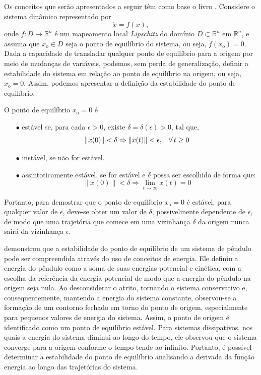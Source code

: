 Os conceitos que serão apresentados a seguir têm como base o livro \cite{khalil2002}. Considere o sistema dinâmico representado por \begin{equation}\dot{x} = f(x), \end{equation} onde $f: D \rightarrow \mathbb{R}^n$ é um mapeamento local \textit{Lipschitz} do domínio $D \subset \mathbb{R}^n$ em $\mathbb{R}^n$, e assuma que $x_{\mathrm{o}} \in D$ seja o ponto de equilíbrio do sistema, ou seja, $f(x_{\mathrm{o}}) = 0$. Dada a capacidade de transladar qualquer ponto de equilíbrio para a origem por meio de mudanças de variáveis, podemos, sem perda de generalização, definir a estabilidade do sistema em relação ao ponto de equilíbrio na origem, ou seja, $x_{\mathrm{o}} = 0$. Assim, podemos apresentar a definição da estabilidade do ponto de equilíbrio.

\begin{definition}
  O ponto de equilíbrio $x_{\mathrm{o}} = 0$ é

  \begin{enumerate}
    \item[$\bullet$] estável se, para cada $\epsilon > 0$, existe $\delta = \delta(\epsilon) > 0$, tal que,
          $$ \lVert x(0)\rVert < \delta \Rightarrow \lVert x(t)\rVert < \epsilon, \hspace{0.3cm} \forall \, t \geq 0$$
    \item[$\bullet$] instável, se não for estável.
    \item[$\bullet$] assintoticamente estável, se for estável e $\delta$ possa   ser escolhido de forma que:
          $$ \lVert x(0)\rVert < \delta \Rightarrow \lim_{t \rightarrow \infty}x(t) = 0$$
  \end{enumerate}
\end{definition}

Portanto, para demostrar que o ponto de equilíbrio $x_{\mathrm{o}} = 0$ é estável, para qualquer valor de $\epsilon$, deve-se obter um valor de $\delta$, possivelmente dependente de $\epsilon$, de modo que uma trajetória que comece em uma vizinhança $\delta$ da origem nunca sairá da vizinhança $\epsilon$.

\cite{khalil2002} demonstrou que a estabilidade do ponto de equilíbrio de um sistema de pêndulo pode ser compreendida através do uso de conceitos de energia. Ele definiu a energia do pêndulo como a soma de suas energias potencial e cinética, com a escolha da referência da energia potencial de modo que a energia do pêndulo na origem seja nula. Ao desconsiderar o atrito, tornando o sistema conservativo e, consequentemente, mantendo a energia do sistema constante, observou-se a formação de um contorno fechado em torno do ponto de origem, especialmente para pequenos valores de energia do sistema. Assim, o ponto de origem é identificado como um ponto de equilíbrio estável. Para sistemas dissipativos, nos quais a energia do sistema diminui ao longo do tempo, ele observou que o sistema converge para a origem conforme o tempo tende ao infinito. Portanto, é possível determinar a estabilidade do ponto de equilíbrio analisando a derivada da função energia ao longo das trajetórias do sistema.

